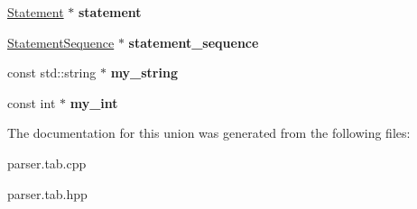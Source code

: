 \begin{DoxyCompactItemize}
\mbox{\label{union_y_y_s_t_y_p_e_a3a91e31e5e63f3d04553e8c84a03a439}} 
\hyperlink{class_statement}{Statement} $\ast$ {\bfseries statement}
\item 
\mbox{\label{union_y_y_s_t_y_p_e_aa0e6b4c9b798fc61cc9e62c5b74f68f6}} 
\hyperlink{class_statement_sequence}{Statement\+Sequence} $\ast$ {\bfseries statement\+\_\+sequence}
\item 
\mbox{\label{union_y_y_s_t_y_p_e_a2c6e041cfb542764b8c40a8f3bb9cf51}} 
const std\+::string $\ast$ {\bfseries my\+\_\+string}
\item 
\mbox{\label{union_y_y_s_t_y_p_e_a5d46ca0a0ad5ea95c057b764a95fdd21}} 
const int $\ast$ {\bfseries my\+\_\+int}
\end{DoxyCompactItemize}


The documentation for this union was generated from the following files\+:\begin{DoxyCompactItemize}
\item 
parser.\+tab.\+cpp\item 
parser.\+tab.\+hpp\end{DoxyCompactItemize}
